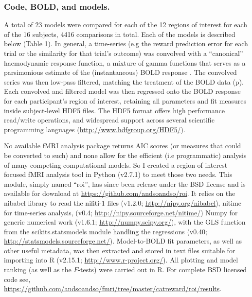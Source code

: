 \documentclass[doc,12pt]{apa}        %
\begin{document}
\subsubsection{Code, BOLD, and models.}
\label{sub:cmb}
A total of 23 models were compared for each of the 12 regions of interest for each of the 16 subjects, 4416 comparisons in total.  Each of the models is described below (Table 1).  In general, a time-series (e.g the reward prediction error for each trial or the similarity for that trial's outcome) was convolved with a ``canonical''  haemodynamic response function, a mixture of gamma functions that serves as a parsimonious estimate of the (instantaneous) BOLD response \cite{Friston:1998p2022}.  The convolved series was then low-pass filtered, matching the treatment of the BOLD data (p\pageref{subsub:preprocessed}).  Each convolved and filtered model was then regressed onto the BOLD response for each participant's region of interest, retaining all parameters and fit measures inside subject-level HDF5 files.  The HDF5 format offers high performance read/write operations, and widespread support across several scientific programming languages (\url{http://www.hdfgroup.org/HDF5/}).

No available fMRI analysis package returns AIC scores (or measures that could be converted to such) and none allow for the efficient (i.e programmatic) analysis of many competing computational models. So I created a region of interest focused fMRI analysis tool in Python (v2.7.1) to meet those two needs.  This module, simply named ``roi'', has since been release under the BSD license and is available for download at \url{https://github.com/andsoandso/roi}. It relies on the nibabel library to read the nifiti-1 files  (v1.2.0; \url{http://nipy.org/nibabel}), nitime for time-series analysis, (v0.4; \url{http://nipy.sourceforge.net/nitime/}) Numpy for generic numerical work (v1.6.1; \url{http://numpy.scipy.org/}), with the GLS function from the scikits.statsmodels module handling the regressions (v0.40; \url{http://statsmodels.sourceforge.net/}).  Model-to-BOLD fit parameters, as well as other useful metadata, was then extracted and stored in text files suitable for importing into R (v2.15.1; \url{http://www.r-project.org/}).  All plotting and model ranking (as well as the $F$-tests) were carried out in R.  For complete BSD licensed code see, \url{https://github.com/andsoandso/fmri/tree/master/catreward/roi/results}.
\end{document}
